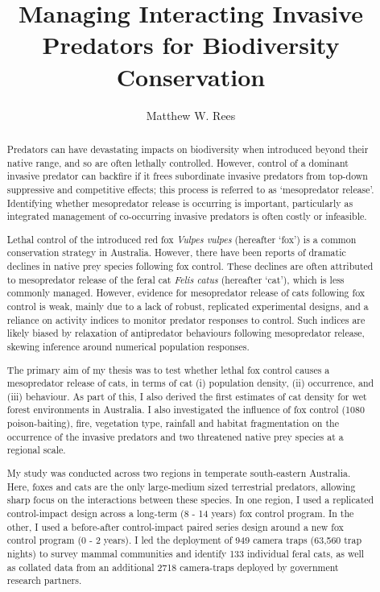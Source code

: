 \documentclass[11pt,a4paper,titlepage,twoside,openright]{style/unimelbthesis}
\title{Managing Interacting Invasive Predators for Biodiversity Conservation}
\author{Matthew W. Rees}
\begin{document}
\begin{frontmatter}


  \maketitle

  \begin{abstract}
    Predators can have devastating impacts on biodiversity when introduced beyond their native range, and so are often lethally controlled. However, control of a dominant invasive predator can backfire if it frees subordinate invasive predators from top-down suppressive and competitive effects; this process is referred to as `mesopredator release'. Identifying whether mesopredator release is occurring is important, particularly as integrated management of co-occurring invasive predators is often costly or infeasible.
    
    Lethal control of the introduced red fox \emph{Vulpes vulpes} (hereafter `fox') is a common conservation strategy in Australia. However, there have been reports of dramatic declines in native prey species following fox control. These declines are often attributed to mesopredator release of the feral cat \emph{Felis catus} (hereafter `cat'), which is less commonly managed. However, evidence for mesopredator release of cats following fox control is weak, mainly due to a lack of robust, replicated experimental designs, and a reliance on activity indices to monitor predator responses to control. Such indices are likely biased by relaxation of antipredator behaviours following mesopredator release, skewing inference around numerical population responses.
    
    The primary aim of my thesis was to test whether lethal fox control causes a mesopredator release of cats, in terms of cat (i) population density, (ii) occurrence, and (iii) behaviour. As part of this, I also derived the first estimates of cat density for wet forest environments in Australia. I also investigated the influence of fox control (1080 poison-baiting), fire, vegetation type, rainfall and habitat fragmentation on the occurrence of the invasive predators and two threatened native prey species at a regional scale.
    
    My study was conducted across two regions in temperate south-eastern Australia. Here, foxes and cats are the only large-medium sized terrestrial predators, allowing sharp focus on the interactions between these species. In one region, I used a replicated control-impact design across a long-term (8 - 14 years) fox control program. In the other, I used a before-after control-impact paired series design around a new fox control program (0 - 2 years). I led the deployment of 949 camera traps (63,560 trap nights) to survey mammal communities and identify 133 individual feral cats, as well as collated data from an additional 2718 camera-traps deployed by government research partners.
    

\end{abstract}
\end{frontmatter}
\end{document}
